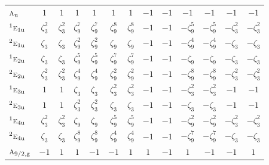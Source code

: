 \documentclass[10pt,a4paper]{article}
\makeatletter
\def\grouprule#1#2{\noalign{\marks\LTgroupmarks{\the\belowrulesep}\nobreak\vskip#1%
  \vskip\aboverulesep}\multispan\LT@cols\unskip{\leaders\hrule\@height#2\hfill\kern\z@}\cr
  \noalign{\penalty\LTrulebreak\vskip\belowrulesep\global\@lastruleclass\z@}}
\numberwithin{equation}{section}
\newcommand{\irr}[1]{\text{\normalfont\scshape #1}}
\newcommand{\conjpair}[1]{{}^{#1}}
\newcommand{\ptag}[1]{\mathrm{#1}}
\newcommand{\rootunity}[1]{\zeta_{#1}}
\makeatother
\begin{document}
{\begin{longtable}{@{}lcccccccccccc@{}}
$\irr{a}_{\ptag{u}}$ & $1$ & $1$ & $1$ & $1$ & $1$ & $1$ & $-1$ & $-1$ & $-1$ & $-1$ & $-1$ & $-1$\\
$\conjpair{1}\irr{e}_{1\ptag{u}}$ & $\rootunity{3}^{2}$ & $\rootunity{3}^{2}$ & $\rootunity{9}^{7}$ & $\rootunity{9}^{7}$ & $\rootunity{9}^{8}$ & $\rootunity{9}^{8}$ & $-1$ & $-1$ & $-\rootunity{9}^{5}$ & $-\rootunity{9}^{5}$ & $-\rootunity{3}^{2}$ & $-\rootunity{3}^{2}$\\
$\conjpair{2}\irr{e}_{1\ptag{u}}$ & $\rootunity{3}$ & $\rootunity{3}$ & $\rootunity{9}^{2}$ & $\rootunity{9}^{2}$ & $\rootunity{9}$ & $\rootunity{9}$ & $-1$ & $-1$ & $-\rootunity{9}^{4}$ & $-\rootunity{9}^{4}$ & $-\rootunity{3}$ & $-\rootunity{3}$\\
$\conjpair{1}\irr{e}_{2\ptag{u}}$ & $\rootunity{3}$ & $\rootunity{3}$ & $\rootunity{9}^{5}$ & $\rootunity{9}^{5}$ & $\rootunity{9}^{7}$ & $\rootunity{9}^{7}$ & $-1$ & $-1$ & $-\rootunity{9}$ & $-\rootunity{9}$ & $-\rootunity{3}$ & $-\rootunity{3}$\\
$\conjpair{2}\irr{e}_{2\ptag{u}}$ & $\rootunity{3}^{2}$ & $\rootunity{3}^{2}$ & $\rootunity{9}^{4}$ & $\rootunity{9}^{4}$ & $\rootunity{9}^{2}$ & $\rootunity{9}^{2}$ & $-1$ & $-1$ & $-\rootunity{9}^{8}$ & $-\rootunity{9}^{8}$ & $-\rootunity{3}^{2}$ & $-\rootunity{3}^{2}$\\
$\conjpair{1}\irr{e}_{3\ptag{u}}$ & $1$ & $1$ & $\rootunity{3}$ & $\rootunity{3}$ & $\rootunity{3}^{2}$ & $\rootunity{3}^{2}$ & $-1$ & $-1$ & $-\rootunity{3}^{2}$ & $-\rootunity{3}^{2}$ & $-1$ & $-1$\\
$\conjpair{2}\irr{e}_{3\ptag{u}}$ & $1$ & $1$ & $\rootunity{3}^{2}$ & $\rootunity{3}^{2}$ & $\rootunity{3}$ & $\rootunity{3}$ & $-1$ & $-1$ & $-\rootunity{3}$ & $-\rootunity{3}$ & $-1$ & $-1$\\
$\conjpair{1}\irr{e}_{4\ptag{u}}$ & $\rootunity{3}^{2}$ & $\rootunity{3}^{2}$ & $\rootunity{9}$ & $\rootunity{9}$ & $\rootunity{9}^{5}$ & $\rootunity{9}^{5}$ & $-1$ & $-1$ & $-\rootunity{9}^{2}$ & $-\rootunity{9}^{2}$ & $-\rootunity{3}^{2}$ & $-\rootunity{3}^{2}$\\
$\conjpair{2}\irr{e}_{4\ptag{u}}$ & $\rootunity{3}$ & $\rootunity{3}$ & $\rootunity{9}^{8}$ & $\rootunity{9}^{8}$ & $\rootunity{9}^{4}$ & $\rootunity{9}^{4}$ & $-1$ & $-1$ & $-\rootunity{9}^{7}$ & $-\rootunity{9}^{7}$ & $-\rootunity{3}$ & $-\rootunity{3}$\\
\grouprule{0pt}{\lightrulewidth}
$\irr{a}_{9/2,\ptag{g}}$ & $-1$ & $1$ & $1$ & $-1$ & $-1$ & $1$ & $1$ & $-1$ & $1$ & $-1$ & $-1$ & $1$\\

\end{longtable}}
\end{document}
